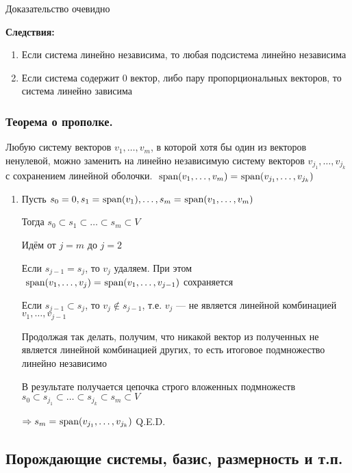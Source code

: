 Доказательство очевидно

\textbf{Следствия:}

\begin{enumerate}
    \item Если система линейно независима, то любая подсистема линейно независима

    \item Если система содержит \(0\) вектор, либо пару пропорциональных векторов, то система линейно зависима
\end{enumerate}



\subsubsection{Теорема о прополке.}

Любую систему векторов \(v_1, \ldots, v_m\), в которой хотя бы один из векторов ненулевой, можно заменить на линейно независимую систему векторов \(v_{j_1}, \ldots, v_{j_k}\) с сохранением линейной оболочки. \(\spann (v_1, \ldots, v_m) = \spann (v_{j_1}, \ldots, v_{j_k})\)

\begin{enumerate}
    \item[] \prooff{}
    Пусть \(s_0 = 0, s_1 = \spann (v_1), \ldots, s_m = \spann (v_1, \ldots, v_m)\)

Тогда \(s_0 \subset s_1 \subset \ldots \subset s_m \subset V\)

Идём от \(j = m\) до \(j = 2\)

Если \(s_{j - 1} = s_j\), то \(v_j\) удаляем. При этом \(\spann (v_1, \ldots, v_j) = \spann (v_1, \ldots, v_{j - 1})\) сохраняется

Если \(s_{j - 1} \subset s_j\), то \(v_j \notin s_{j - 1}\), т.е. \(v_j\) --- не является линейной комбинацией \(v_1, \ldots, v_{j - 1}\)

Продолжая так делать, получим, что никакой вектор из полученных не является линейной комбинацией других, то есть итоговое подмножество линейно независимо

В результате получается цепочка строго вложенных подмножеств \(s_0 \subset s_{j_1} \subset \ldots \subset s_{j_k} \subset s_m \subset V \)

\(\Rightarrow s_m = \spann (v_{j_1}, \ldots, v_{j_k})\) \hfill Q.E.D.
\end{enumerate}

\subsection{Порождающие системы, базис, размерность и т.п.}


